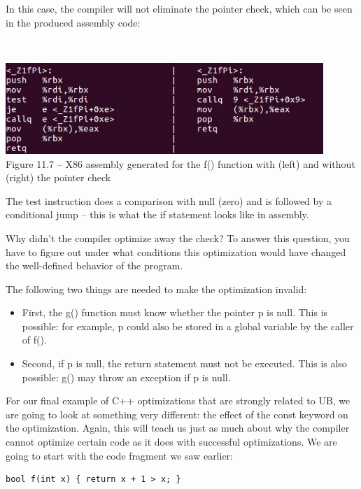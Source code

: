 In this case, the compiler will not eliminate the pointer check, which can be seen in the produced assembly code:

\hspace*{\fill} \\ %
\begin{center}
\includegraphics[width=0.9\textwidth]{content/3/chapter11/images/7.jpg}\\
Figure 11.7 – X86 assembly generated for the f() function with (left) and without (right) the pointer check
\end{center}

The test instruction does a comparison with null (zero) and is followed by a conditional jump – this is what the if statement looks like in assembly. 

Why didn't the compiler optimize away the check? To answer this question, you have to figure out under what conditions this optimization would have changed the well-defined behavior of the program.

The following two things are needed to make the optimization invalid:

\begin{itemize}
\item 
First, the g() function must know whether the pointer p is null. This is possible: for example, p could also be stored in a global variable by the caller of f(). 

\item 
Second, if p is null, the return statement must not be executed. This is also possible: g() may throw an exception if p is null. 
\end{itemize}

For our final example of C++ optimizations that are strongly related to UB, we are going to look at something very different: the effect of the const keyword on the optimization. Again, this will teach us just as much about why the compiler cannot optimize certain code as it does with successful optimizations. We are going to start with the code fragment we saw earlier:

\begin{lstlisting}[style=styleCXX]
bool f(int x) { return x + 1 > x; }
\end{lstlisting}

